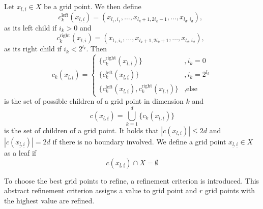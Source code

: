 \documentclass[
  a4paper,  %
  twoside,  %
  bibliography=totoc,
  headsepline,
  cleardoublepage=empty,
  parskip=half,
  draft=false
]{scrbook}
\begin{document}
\begin{definition}
Let $x_{\underline{l},\underline{i}} \in X$ be a grid point.
We then define
\begin{equation}
c_{k}^{\text{left}}(x_{\underline{l},\underline{i}})=(x_{l_1,i_1}, \dots, x_{l_k + 1,2  i_k - 1}, \dots, x_{l_d,i_d}), ~~ 
\end{equation}
as its left child if $i_k > 0$ and
\begin{equation}
c_{k}^{\text{right}}(x_{\underline{l},\underline{i}})=(x_{l_1,i_1}, \dots, x_{l_k + 1,2  i_k + 1}, \dots, x_{l_d,i_d}), ~~ 
\end{equation}
as its right child if $i_k < 2^{l_k}$.
Then
\begin{equation}
c_{k}(x_{\underline{l},\underline{i}})=
\begin{cases}
\{c_{k}^{\text{right}}(x_{\underline{l},\underline{i}})\}&, i_k=0\\
\{c_{k}^{\text{left}}(x_{\underline{l},\underline{i}})\}&,i_k= 2^{l_k}\\
\{c_{k}^{\text{left}}(x_{\underline{l},\underline{i}}),c_{k}^{\text{right}}(x_{\underline{l},\underline{i}}) \}&, \text{else}
\end{cases}
\end{equation}
is the set of possible children of a grid point in dimension $k$ and 
\begin{equation}
c(x_{\underline{l},\underline{i}})= \bigcup_{k=1}^d \{c_{k}(x_{\underline{l},\underline{i}})\}
\end{equation}
is the set of children of a grid point. It holds that $|c(x_{\underline{l},\underline{i}})| \leq 2d$ and $|c(x_{\underline{l},\underline{i}})| =2d$ if there is no boundary involved.
We define a grid point $x_{\underline{l},\underline{i}} \in X$ as a leaf if
\begin{equation}
c(x_{\underline{l},\underline{i}}) \cap X = \emptyset
\end{equation}
\end{definition}

To choose the best grid points to refine, a refinement criterion is introduced.
This abstract refinement criterion assigns a value to grid point and $r$ grid points with the highest value are refined.
\end{document}
